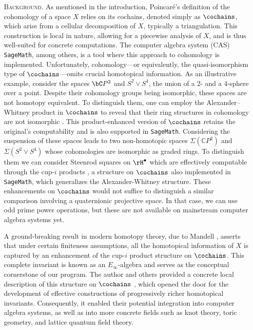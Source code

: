 
\smallskip\textsc{Background}.
As mentioned in the introduction, Poincaré's definition of the cohomology of a space $X$ relies on its cochains, denoted simply as $\cochains$, which arise from a cellular decomposition of $X$, typically a triangulation.
This construction is local in nature, allowing for a piecewise analysis of $X$, and is thus well-suited for concrete computations.
The computer algebra system (CAS) \texttt{SageMath}, among others, is a tool where this approach to cohomology is implemented.
Unfortunately, cohomology—or equivalently, the quasi-isomorphism type of $\cochains$—omits crucial homotopical information.
As an illustrative example, consider the spaces $\bC P^2$ and $S^2 \vee S^4$, the union of a 2- and a 4-sphere over a point.
Despite their cohomology groups being isomorphic, these spaces are not homotopy equivalent.
To distinguish them, one can employ the Alexander--Whitney product in $\cochains$ to reveal that their ring structures in cohomology are not isomorphic \cite{alexander1936ring, whitney1938products}.
This product-enhanced version of $\cochains$ retains the original's computability and is also supported in \texttt{SageMath}.
Considering the suspension of these spaces leads to two non-homotopic spaces $\Sigma(\mathbb{C} P^2)$ and $\Sigma(S^2 \vee S^4)$ whose cohomologies are isomorphic as graded rings.
To distinguish them we can consider Steenrod squares on $\rH^\bullet$ which are effectively computable through the cup-$i$ products \cite{steenrod1947products}, a structure on $\cochains$ also implemented in \texttt{SageMath}, which generalizes the Alexander-Whitney structure.
These enhancements on $\cochains$ would not suffice to distinguish a similar comparison involving a quaternionic projective space.
In that case, we can use odd prime power operations, but these are not available on mainstream computer algebra systems yet.

A ground-breaking result in modern homotopy theory, due to Mandell \cite{mandell2001padic,mandell2006homotopy_type}, asserts that under certain finiteness assumptions, all the homotopical information of $X$ is captured by an enhancement of the cup-$i$ product structure on $\cochains$.
This complete invariant is known as an $E_\infty$-algebra and serves as the conceptual cornerstone of our program.
The author and others provided a concrete local description of this structure on $\cochains$ \cite{medina2020prop1, mcclure2003multivariable, berger2004combinatorial}, which opened the door for the development of effective constructions of progressively richer homotopical invariants.
Consequently, it enabled their potential integration into computer algebra systems, as well as into more concrete fields such as knot theory, toric geometry, and lattice quantum field theory.

